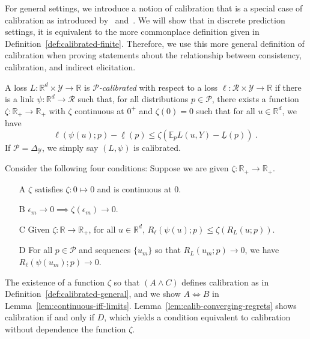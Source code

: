 \documentclass[anon,12pt]{colt2021} %
\newcommand{\Comments}{1}
\newcommand{\mytodo}[2]{\ifnum\Comments=1%
	\todo[linecolor=#1!80!black,backgroundcolor=#1,bordercolor=#1!80!black]{#2}\fi}
\newcommand{\jessiet}[1]{\mytodo{purple!20!white}{JF: #1}}
\newcommand{\reals}{\mathbb{R}}
\newcommand{\simplex}{\Delta_\Y}
\newcommand{\E}{\mathbb{E}}
\newcommand{\R}{\mathcal{R}}
\renewcommand{\P}{\mathcal{P}}
\newcommand{\Y}{\mathcal{Y}}
\newcommand{\exploss}[3]{\E_{#3} #1(#2,Y)}
\newcommand{\risk}[1]{\underline{#1}}
\begin{document}
For general settings, we introduce a notion of calibration that is a special case of calibration as introduced by~\citet[Definition 2.7]{steinwart2007compare} and~\citet[Chapter 3]{steinwart2008support}. 
We will show that in discrete prediction settings, it is equivalent to the more commonplace definition given in Definition~\ref{def:calibrated-finite}.
Therefore, we use this more general definition of calibration when proving statements about the relationship between consistency, calibration, and indirect elicitation.

\begin{definition}[Calibrated]\label{def:calibrated-general}
	A loss $L:\reals^d \times \Y \to \reals$ is \emph{$\P$-calibrated} with respect to a loss $\ell : \R \times \Y \to \reals$ if there is a link $\psi : \reals^d \to \R$ such that, for all distributions $p \in \P$, there exists a function $\zeta : \reals_+ \to \reals_+$ with $\zeta$ continuous at $0^+$ and $\zeta(0) = 0$ such that for all $u \in \reals^d$, we have
	\begin{equation}\label{eq:calibrated-general}
	\ell( \psi(u); p) - \risk{\ell}(p)  \leq \zeta \left(  \exploss{L}{u}{p} - \risk{L}(p) \right)~.~
	\end{equation}
	If $\P = \simplex$, we simply say $(L, \psi)$ is calibrated.
\end{definition}

Consider the following four conditions: Suppose we are given $\zeta:\reals_+ \to \reals_+$.
\begin{enumerate}
	\item [A] $\zeta$ satisfies $\zeta : 0 \mapsto 0$ and is continuous at $0$.
	\item [B] $\epsilon_m \to 0 \implies \zeta(\epsilon_m) \to 0$.
	\item [C] Given $\zeta:\reals \to \reals_+$, for all $u \in \reals^d$, $R_\ell(\psi(u); p) \leq \zeta(R_L(u;p))$.
	\item [D] For all $p \in \P$ and sequences $\{u_m\}$ so that $R_L(u_m; p) \to 0$, we have $R_\ell(\psi(u_m); p) \to 0$.
\end{enumerate}
The existence of a function $\zeta$ so that $(A \wedge C)$ defines calibration as in Definition~\ref{def:calibrated-general}, and we show $A \iff B$ in Lemma~\ref{lem:continuous-iff-limits}.  
Lemma~\ref{lem:calib-converging-regrets} shows calibration if and only if $D$, which yields a condition equivalent to calibration without dependence the function $\zeta$.
\end{document}

